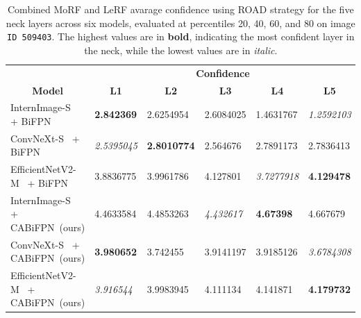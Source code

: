 \begin{table}[!htbp]
\begin{adjustbox}{max width=\textwidth}
\begin{tabular}{l|lllll|}
\cline{2-6}
\multicolumn{1}{c|}{} & \multicolumn{5}{c|}{\textbf{Confidence}} \\ \cline{1-1}
\multicolumn{1}{|c|}{\textbf{Model}} & \multicolumn{1}{c}{\textbf{L1}} & \multicolumn{1}{c}{\textbf{L2}} & \multicolumn{1}{c}{\textbf{L3}} & \multicolumn{1}{c}{\textbf{L4}} & \multicolumn{1}{c|}{\textbf{L5}} \\ \hline
\multicolumn{1}{|l|}{InternImage-S~\cite{wang2023internimage} + BiFPN~\cite{tan2020efficientdet}} & \textbf{2.842369} & 2.6254954 & 2.6084025 & 1.4631767 & \textit{1.2592103} \\
\multicolumn{1}{|l|}{ConvNeXt-S~\cite{liu2022convnet} + BiFPN~\cite{tan2020efficientdet}} & \textit{2.5395045} & \textbf{2.8010774} & 2.564676 & 2.7891173 & 2.7836413 \\
\multicolumn{1}{|l|}{EfficientNetV2-M~\cite{tan2021efficientnetv2} + BiFPN~\cite{tan2020efficientdet}} & 3.8836775 & 3.9961786 & 4.127801 & \textit{3.7277918} & \textbf{4.129478} \\ \hline
\multicolumn{1}{|l|}{InternImage-S~\cite{wang2023internimage} + CABiFPN~(ours)} & 4.4633584 & 4.4853263 & \textit{4.432617} & \textbf{4.67398} & 4.667679 \\
\multicolumn{1}{|l|}{ConvNeXt-S~\cite{liu2022convnet} + CABiFPN~(ours)} & \textbf{3.980652} & 3.742455 & 3.9141197 & 3.9185126 & \textit{3.6784308} \\
\multicolumn{1}{|l|}{EfficientNetV2-M~\cite{tan2021efficientnetv2} + CABiFPN~(ours)} & \textit{3.916544} & 3.9983945 & 4.111134 & 4.141871 & \textbf{4.179732} \\ \hline
\end{tabular}
\end{adjustbox}
\caption[Combined MoRF and LeRF avarage confidence using ROAD strategy on image \texttt{ID 509403}.]{Combined MoRF and LeRF avarage confidence using ROAD strategy for the five neck layers across six models, evaluated at percentiles 20, 40, 60, and 80 on image \texttt{ID 509403}. The highest values are in \textbf{bold}, indicating the most confident layer in the neck, while the lowest values are in \textit{italic}.}
\label{tab:results:509403:comb-road}
\end{table}


